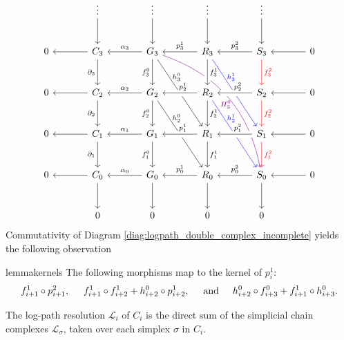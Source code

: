 \documentclass[11pt]{article}
\begin{document}
\begin{equation} \label{diag:logpath_double_complex}
\begin{tikzcd} [column sep=large,row sep=large]
& \vdots \arrow[d] & \vdots \arrow[d] & \vdots \arrow[d] & \vdots \arrow[d] \\
0 & C_3 \arrow[l] \arrow[d,swap,"\partial_3"] & G_3 \arrow[l,swap,"\alpha_3"] \arrow[d,swap,"f_3^0"] \arrow[ddr,"h_3^0"{xshift=-10pt,yshift=10pt}] \arrow[dddrr,violet,bend left,"H_3^0"{xshift=-10pt,yshift=-14pt}] & R_3 \arrow[l,swap,"p_3^1"] \arrow[d,crossing over,"f_3^1"] \arrow[ddr,blue,"h_3^1"{xshift=-10pt,yshift=10pt}] & S_3 \arrow[l,swap,"p^2_3"] \arrow[d,red,"f_3^2"] & 0 \arrow[l] \\
0 & C_2 \arrow[l] \arrow[d,swap,"\partial_2"] & G_2 \arrow[l,swap,"\alpha_2"] \arrow[d,swap,"f_2^0"] \arrow[ddr,"h_2^0"{xshift=-10pt,yshift=10pt}] & R_2 \arrow[l,swap,"p_2^1"{xshift=3pt},crossing over] \arrow[d,"f_2^1"] \arrow[ddr,blue,"h_2^1"{xshift=-10pt,yshift=10pt}] & S_2 \arrow[l,swap,"p^2_2"{xshift=3pt},crossing over] \arrow[d,red,"f_2^2"] & 0 \arrow[l] \\
0 & C_1 \arrow[l] \arrow[d,swap,"\partial_1"] & G_1 \arrow[l,swap,"\alpha_1"] \arrow[d,swap,"f_1^0"] & R_1 \arrow[l,swap,"p_1^1"{xshift=3pt},crossing over] \arrow[d,"f_1^1"] & S_1 \arrow[l,swap,"p^2_1"{xshift=3pt},crossing over] \arrow[d,red,"f_1^2"] & 0 \arrow[l] \\
0 & C_0 \arrow[l] \arrow[d] & G_0 \arrow[l,swap,"\alpha_0"] \arrow[d] & R_0 \arrow[l,swap,"p_0^1"] \arrow[d] & S_0 \arrow[l,swap,"p^2_0"] \arrow [d]& 0 \arrow[l] \\
& 0 & 0 & 0 & 0
\end{tikzcd}
\end{equation} 
%
%
Commutativity of Diagram \eqref{diag:logpath_double_complex_incomplete} yields the following observation
%
\begin{restatable}{lemma}{kernels}
 \label{lem:kernels}
The following morphisms map to the kernel of $p^1_{i}$:
\begin{equation}
    \label{eq:logpath_morphisms}
f^1_{i+1}\circ p^2_{i+1} , \hspace{0.5cm} f^1_{i+1}\circ f^1_{i+2} + h^0_{i+2}\circ p^1_{i+2} ,  \hspace{0.5cm} \text{and} \hspace{0.5cm} h^0_{i+2}\circ f^0_{i+3} + f^1_{i+1} \circ h^0_{i+3} .
\end{equation}   
\end{restatable}
%
%
The log-path resolution $\mathcal{L}_i$ of $C_i$ is the direct sum of the simplicial chain complexes $\mathcal{L}_\sigma$, taken over each simplex $\sigma$ in $C_i$.
\end{document}
